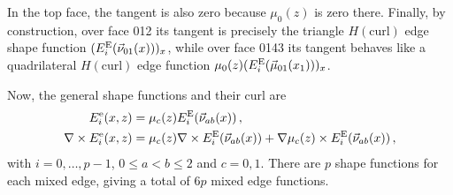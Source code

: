 In the top face, the tangent is also zero because $\mu_0(z)$ is zero there.
Finally, by construction, over face 012 its tangent is precisely the triangle $H(\text{curl})$ edge shape function $(E_i^{\mathrm{E}}(\vec{\nu}_{01}(x)))_x$, while over face 0143 its tangent behaves like a quadrilateral $H(\text{curl})$ edge function $\mu_0(z)(E_i^{\mathrm{E}}(\vec{\mu}_{01}(x_1)))_x$.

Now, the general shape functions and their curl are
\begin{equation}
	\begin{aligned}	
		E_i^\mathrm{e}(x,z)&=\mu_c(z)E_i^{\mathrm{E}}(\vec{\nu}_{ab}(x))\,,\\
		\nabla\times E_i^\mathrm{e}(x,z)&=\mu_c(z)\nabla\times E_i^{\mathrm{E}}(\vec{\nu}_{ab}(x))
			+\nabla\mu_c(z)\times E_i^{\mathrm{E}}(\vec{\nu}_{ab}(x))\,,
	\end{aligned}
\end{equation}
with $i=0,\ldots,p-1$, $0\leq a<b\leq2$ and $c=0,1$. 
There are $p$ shape functions for each mixed edge, giving a total of $6p$ mixed edge functions.



